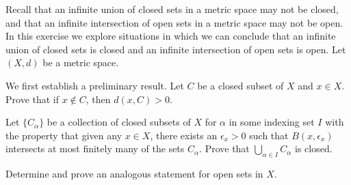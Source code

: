 \item Recall that an infinite union of closed sets in a metric space may not be closed, and that an infinite intersection of open sets in a metric space may not be open. In this exercise we explore situations in which we can conclude that an infinite union of closed sets is closed and an infinite intersection of open sets is open. Let $(X,d)$ be a metric space. 
	\ba
	\item We first establish a preliminary result. Let $C$ be a closed subset of $X$ and $x \in X$. Prove that if $x \notin C$, then $d(x,C) > 0$. 

	\item Let $\{C_{\alpha}\}$ be a collection of closed subsets of $X$ for $\alpha$ in some indexing set $I$ with the property that given any $x \in X$, there exists an $\epsilon_x > 0$ such that $B(x, \epsilon_x)$ intersects at most finitely many of the sets $C_{\alpha}$. Prove that $\bigcup_{\alpha \in I} C_{\alpha}$ is closed. 	

	\item Determine and prove an analogous statement for open sets in $X$. 
	
	\ea

